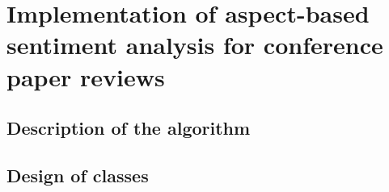 \chapter{Implementation of aspect-based sentiment analysis for conference paper reviews}

\section{Description of the algorithm}

\section{Design of classes}


